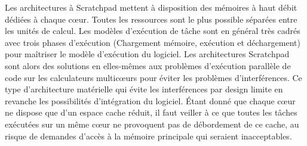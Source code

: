 \documentclass[french, a4paper, 11pt, twoside, pdftex]{StyleThese}
\begin{document}
		Les architectures à Scratchpad mettent à disposition des mémoires à haut débit dédiées à chaque cœur. Toutes les ressources sont le plus possible séparées entre les unités de calcul. Les modèles d'exécution de tâche sont en général très cadrés avec trois phases d'exécution (Chargement mémoire, exécution et déchargement) pour maîtriser le modèle d'exécution du logiciel. Les architectures Scratchpad sont alors des solutions en elles-mêmes aux problèmes d'exécution parallèle de code sur les calculateurs multicœurs pour éviter les problèmes d'interférences. Ce type d'architecture matérielle qui évite les interférences par design limite en revanche les possibilités d'intégration du logiciel. Étant donné que chaque cœur ne dispose que d'un espace cache réduit, il faut veiller à ce que toutes les tâches exécutées sur un même cœur ne provoquent pas de débordement de ce cache, au risque de demandes d'accès à la mémoire principale qui seraient inacceptables.
			
\end{document}
